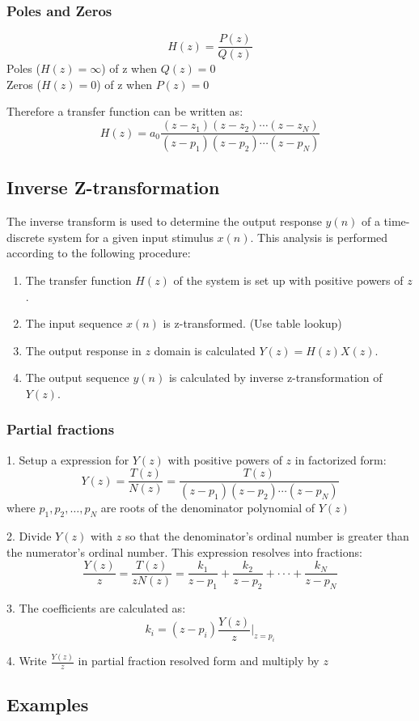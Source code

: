 \subsubsection{Poles and Zeros}
$$H(z)=\frac{P(z)}{Q(z)}$$
Poles ($H(z)=\infty$) of z when $Q(z)=0$\\
Zeros ($H(z)=0$) of z when $P(z)=0$

Therefore a transfer function can be written as:
$$H(z)=a_0\frac{(z-z_1)(z-z_2)\cdots(z-z_N)}{(z-p_1)(z-p_2)\cdots(z-p_N)}$$

\subsection{Inverse Z-transformation}
The inverse transform is used to determine the output response $y(n)$ of a time-discrete system for a given input stimulus $x(n)$. This analysis is performed according to the following procedure:
\begin{enumerate}
  \item The transfer function $H(z)$ of the system is set up with positive powers of $z$.
  \item The input sequence $x(n)$ is z-transformed. (Use table lookup)
  \item The output response in $z$ domain is calculated $Y(z)=H(z)X(z)$.
  \item The output sequence $y(n)$ is calculated by inverse z-transformation of $Y(z)$.
\end{enumerate}

\subsubsection{Partial fractions}
1. Setup a expression for $Y(z)$ with positive powers of $z$ in factorized form:
$$Y(z)=\frac{T(z)}{N(z)}=\frac{T(z)}{(z-p_1)(z-p_2)\cdots(z-p_N)}$$
where $p_1,p_2,\dots,p_N$ are roots of the denominator polynomial of $Y(z)$

2. Divide $Y(z)$ with $z$ so that the denominator's ordinal number is greater than the numerator's ordinal number. This expression resolves into fractions:
$$\frac{Y(z)}{z}=\frac{T(z)}{z N(z)}=\frac{k_{1}}{z-p_{1}}+\frac{k_{2}}{z-p_{2}}+\cdot\cdot\cdot+\frac{k_{N}}{z-p_{N}}$$

3. The coefficients are calculated as:
$$k_{i}=(z-p_{i})\frac{Y(z)}{z}\vert_{z=p_{i}}$$

4. Write $\frac{Y(z)}{z}$ in partial fraction resolved form and multiply by $z$
\subsection{Examples}
